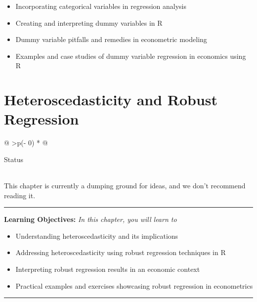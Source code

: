 \documentclass[
  letterpaper,
  twoside,
  openright,
  headsepline,
  footsepline,
  listof = totocnumbered,
  chapterprefix = true,
  titlepage = false]{scrbook}
\providecommand{\abstractname}{Learning Objectives} %
\newenvironment{objectives}[1]{%
	\hrule
	\vspace{5pt}
	\small\textbf{\abstractname: } 
	\newline
	\vspace{0.1cm}
	\small\emph{#1} %
	\itshape %
}{%
	\vspace{5pt}
	\hrule
	\vspace{0.6cm}
}
\begin{document}
\begin{itemize}
\item
  Incorporating categorical variables in regression analysis
\item
  Creating and interpreting dummy variables in R
\item
  Dummy variable pitfalls and remedies in econometric modeling
\item
  Examples and case studies of dummy variable regression in economics
  using R
\end{itemize}


\hypertarget{heteroscedasticity-and-robust-regression}{%
\chapter{Heteroscedasticity and Robust
Regression}\label{heteroscedasticity-and-robust-regression}}

\begin{longtable}[]{@{}
  >{\centering\arraybackslash}p{(\columnwidth - 0\tabcolsep) * }@{}}
\toprule\noalign{}
\begin{minipage}[b]{\linewidth}\centering
Status
\end{minipage} \\
\midrule\noalign{}
\endhead
\bottomrule\noalign{}
\endlastfoot
This chapter is currently a dumping ground for ideas, and we don't
recommend reading it. \\
\end{longtable}

\begin{objectives}{In this chapter, you will learn to}
\begin{itemize}

\item{Understanding heteroscedasticity and its implications}

\item{Addressing heteroscedasticity using robust regression techniques in R}

\item{Interpreting robust regression results in an economic context}

\item{Practical examples and exercises showcasing robust regression in econometrics}

\end{itemize}

\end{objectives}
\end{document}
